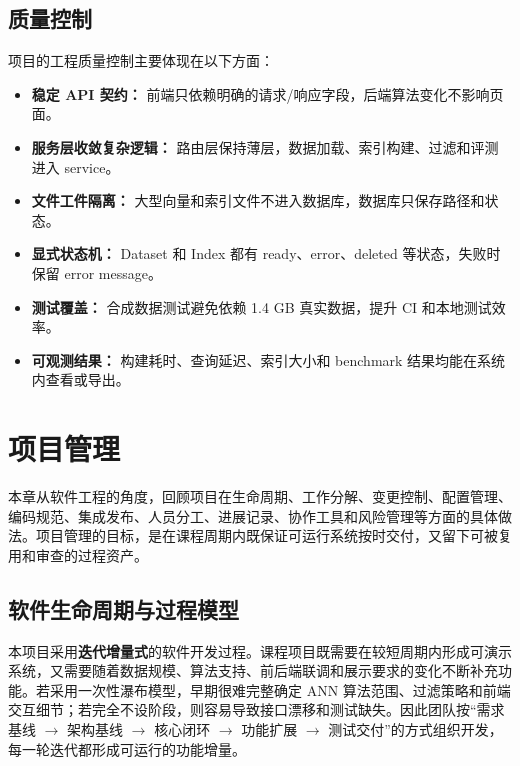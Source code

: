 \documentclass[UTF8,a4paper,12pt]{ctexrep}
\begin{document}
\section{质量控制}

项目的工程质量控制主要体现在以下方面：

\begin{itemize}
  \item \textbf{稳定 API 契约：} 前端只依赖明确的请求/响应字段，后端算法变化不影响页面。
  \item \textbf{服务层收敛复杂逻辑：} 路由层保持薄层，数据加载、索引构建、过滤和评测进入 service。
  \item \textbf{文件工件隔离：} 大型向量和索引文件不进入数据库，数据库只保存路径和状态。
  \item \textbf{显式状态机：} Dataset 和 Index 都有 ready、error、deleted 等状态，失败时保留 error message。
  \item \textbf{测试覆盖：} 合成数据测试避免依赖 1.4 GB 真实数据，提升 CI 和本地测试效率。
  \item \textbf{可观测结果：} 构建耗时、查询延迟、索引大小和 benchmark 结果均能在系统内查看或导出。
\end{itemize}

\chapter{项目管理}

本章从软件工程的角度，回顾项目在生命周期、工作分解、变更控制、配置管理、编码规范、集成发布、人员分工、进展记录、协作工具和风险管理等方面的具体做法。项目管理的目标，是在课程周期内既保证可运行系统按时交付，又留下可被复用和审查的过程资产。

\section{软件生命周期与过程模型}

本项目采用\textbf{迭代增量式}的软件开发过程。课程项目既需要在较短周期内形成可演示系统，又需要随着数据规模、算法支持、前后端联调和展示要求的变化不断补充功能。若采用一次性瀑布模型，早期很难完整确定 ANN 算法范围、过滤策略和前端交互细节；若完全不设阶段，则容易导致接口漂移和测试缺失。因此团队按``需求基线 $\to$ 架构基线 $\to$ 核心闭环 $\to$ 功能扩展 $\to$ 测试交付''的方式组织开发，每一轮迭代都形成可运行的功能增量。
\end{document}
